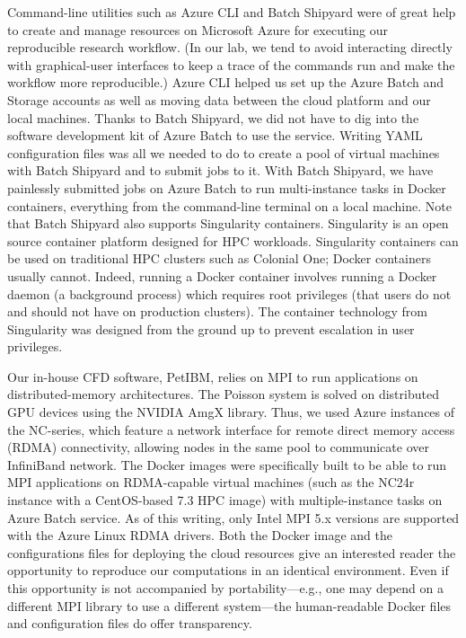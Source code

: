 \documentclass[10pt,journal,compsoc]{IEEEtran}
\begin{document}
Command-line utilities such as Azure CLI and Batch Shipyard were of great help to create and manage resources on Microsoft Azure for executing our reproducible research workflow.
(In our lab, we tend to avoid interacting directly with graphical-user interfaces to keep a trace of the commands run and make the workflow more reproducible.)
Azure CLI helped us set up the Azure Batch and Storage accounts as well as moving data between the cloud platform and our local machines.
Thanks to Batch Shipyard, we did not have to dig into the software development kit of Azure Batch to use the service.
Writing YAML configuration files was all we needed to do to create a pool of virtual machines with Batch Shipyard and to submit jobs to it.
With Batch Shipyard, we have painlessly submitted jobs on Azure Batch to run multi-instance tasks in Docker containers, everything from the command-line terminal on a local machine.
Note that Batch Shipyard also supports Singularity containers.
Singularity is an open source container platform designed for HPC workloads.
Singularity containers can be used on traditional HPC clusters such as Colonial One; Docker containers usually cannot.
Indeed, running a Docker container involves running a Docker daemon (a background process) which requires root privileges (that users do not and should not have on production clusters).
The container technology from Singularity was designed from the ground up to prevent escalation in user privileges.

Our in-house CFD software, PetIBM, relies on MPI to run applications on distributed-memory architectures.
The Poisson system is solved on distributed GPU devices using the NVIDIA AmgX library.
Thus, we used Azure instances of the NC-series, which feature a network interface for remote direct memory access (RDMA) connectivity, allowing nodes in the same pool to communicate over InfiniBand network.
The Docker images were specifically built to be able to run MPI applications on RDMA-capable virtual machines (such as the NC24r instance with a CentOS-based 7.3 HPC image) with multiple-instance tasks on Azure Batch service.
As of this writing, only Intel MPI 5.x versions are supported with the Azure Linux RDMA drivers.
Both the Docker image and the configurations files for deploying the cloud resources give an interested reader the opportunity to reproduce our computations in an identical environment.
Even if this opportunity is not accompanied by portability---e.g., one may depend on a different MPI library to use a different system---the human-readable Docker files and configuration files do offer transparency.
\end{document}

